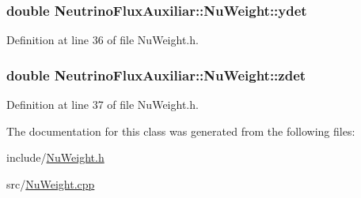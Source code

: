 \hypertarget{class_neutrino_flux_auxiliar_1_1_nu_weight_a4041206ba690070b210e5d8b28497c56}{
\subsubsection[{ydet}]{\setlength{\rightskip}{0pt plus 5cm}double Neutrino\-Flux\-Auxiliar\-::\-Nu\-Weight\-::ydet\hspace{0.3cm}{\ttfamily [private]}}}\label{class_neutrino_flux_auxiliar_1_1_nu_weight_a4041206ba690070b210e5d8b28497c56}


Definition at line 36 of file Nu\-Weight.\-h.

\hypertarget{class_neutrino_flux_auxiliar_1_1_nu_weight_a4e33b89875dd565737b9a35e201b4585}{
\subsubsection[{zdet}]{\setlength{\rightskip}{0pt plus 5cm}double Neutrino\-Flux\-Auxiliar\-::\-Nu\-Weight\-::zdet\hspace{0.3cm}{\ttfamily [private]}}}\label{class_neutrino_flux_auxiliar_1_1_nu_weight_a4e33b89875dd565737b9a35e201b4585}


Definition at line 37 of file Nu\-Weight.\-h.



The documentation for this class was generated from the following files\-:\begin{DoxyCompactItemize}
\item 
include/\hyperlink{_nu_weight_8h}{Nu\-Weight.\-h}\item 
src/\hyperlink{_nu_weight_8cpp}{Nu\-Weight.\-cpp}\end{DoxyCompactItemize}
